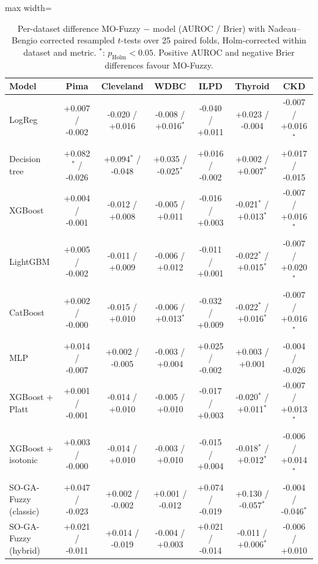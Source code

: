 \begin{table}[t]
\centering
\scriptsize
\setlength{\tabcolsep}{3pt}
\caption{Per-dataset difference MO-Fuzzy $-$ model (AUROC / Brier) with Nadeau--Bengio corrected resampled $t$-tests over 25 paired folds, Holm-corrected within dataset and metric. $^{*}$: $p_{\mathrm{Holm}}<0.05$. Positive AUROC and negative Brier differences favour MO-Fuzzy.}
\label{tab:nb}
\begin{adjustbox}{max width=\linewidth}
\begin{tabular}{lcccccc}
\toprule
Model & Pima & Cleveland & WDBC & ILPD & Thyroid & CKD \\
\midrule
LogReg & +0.007 / -0.002 & -0.020 / +0.016 & -0.008 / +0.016$^{*}$ & -0.040 / +0.011 & +0.023 / -0.004 & -0.007 / +0.016$^{*}$ \\
Decision tree & +0.082$^{*}$ / -0.026 & +0.094$^{*}$ / -0.048 & +0.035 / -0.025$^{*}$ & +0.016 / -0.002 & +0.002 / +0.007$^{*}$ & +0.017 / -0.015 \\
XGBoost & +0.004 / -0.001 & -0.012 / +0.008 & -0.005 / +0.011 & -0.016 / +0.003 & -0.021$^{*}$ / +0.013$^{*}$ & -0.007 / +0.016$^{*}$ \\
LightGBM & +0.005 / -0.002 & -0.011 / +0.009 & -0.006 / +0.012 & -0.011 / +0.001 & -0.022$^{*}$ / +0.015$^{*}$ & -0.007 / +0.020$^{*}$ \\
CatBoost & +0.002 / -0.000 & -0.015 / +0.010 & -0.006 / +0.013$^{*}$ & -0.032 / +0.009 & -0.022$^{*}$ / +0.016$^{*}$ & -0.007 / +0.016$^{*}$ \\
MLP & +0.014 / -0.007 & +0.002 / -0.005 & -0.003 / +0.004 & +0.025 / -0.002 & +0.003 / +0.001 & -0.004 / -0.026 \\
XGBoost + Platt & +0.001 / -0.001 & -0.014 / +0.010 & -0.005 / +0.010 & -0.017 / +0.003 & -0.020$^{*}$ / +0.011$^{*}$ & -0.007 / +0.013$^{*}$ \\
XGBoost + isotonic & +0.003 / -0.000 & -0.014 / +0.010 & -0.003 / +0.010 & -0.015 / +0.004 & -0.018$^{*}$ / +0.012$^{*}$ & -0.006 / +0.014$^{*}$ \\
SO-GA-Fuzzy (classic) & +0.047 / -0.023 & +0.002 / -0.002 & +0.001 / -0.012 & +0.074 / -0.019 & +0.130 / -0.057$^{*}$ & -0.004 / -0.046$^{*}$ \\
SO-GA-Fuzzy (hybrid) & +0.021 / -0.011 & +0.014 / -0.019 & -0.004 / +0.003 & +0.021 / -0.014 & -0.011 / +0.006$^{*}$ & -0.006 / +0.010 \\
\bottomrule
\end{tabular}
\end{adjustbox}
\end{table}
